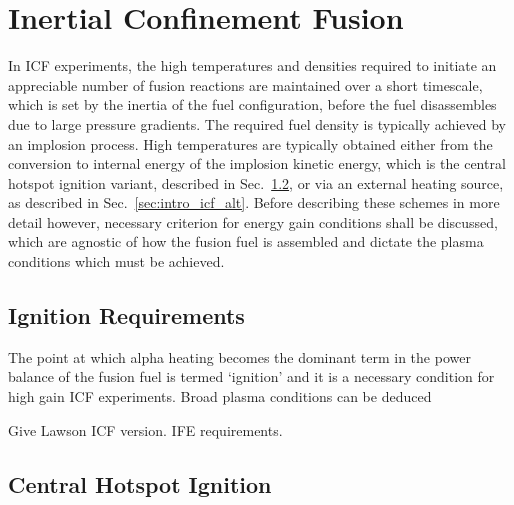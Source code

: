\section{Inertial Confinement Fusion}%
\label{sec:intro_ICF}

In \ac{ICF} experiments, the high temperatures and densities required to initiate an appreciable number of fusion reactions are maintained over a short timescale, which is set by the inertia of the fuel configuration, before the fuel disassembles due to large pressure gradients.
The required fuel density is typically achieved by an implosion process.
High temperatures are typically obtained either from the conversion to internal energy of the implosion kinetic energy, which is the central hotspot ignition variant, described in Sec.~\ref{sec:intro_centralhotspot}, or via an external heating source, as described in Sec.~\ref{sec:intro_icf_alt}.
Before describing these schemes in more detail however, necessary criterion for energy gain conditions shall be discussed, which are agnostic of how the fusion fuel is assembled and dictate the plasma conditions which must be achieved.

\subsection{Ignition Requirements}%
\label{sec:intro_icf_ignition}

The point at which alpha heating becomes the dominant term in the power balance of the fusion fuel is termed `ignition' and it is a necessary condition for high gain \ac{ICF} experiments.
Broad plasma conditions can be deduced 

Give Lawson ICF version.
IFE requirements.

\subsection{Central Hotspot Ignition}%
\label{sec:intro_centralhotspot}

